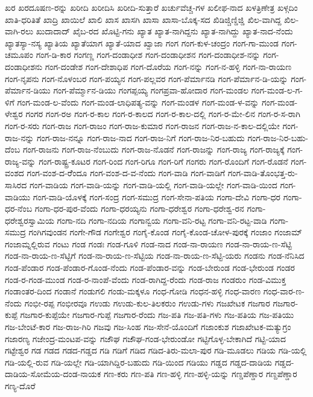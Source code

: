 {ಖರ
ಖರದೂಷಣ-ರನ್ನು
ಖರೀದಿ
ಖರೀದಿಸಿ
ಖರೀದಿ-ಸುತ್ತಾರೆ
ಖರ್ಚುವೆಚ್ಚ-ಗಳ
ಖಲೀಫ-ನಾದ
ಖಳತ್ರಿಣೇತ್ರ
ಖಳ್ಗದಿಂ
ಖಾತಿ-ಧರಿತಿತೆ
ಖಾದ್ರಿ
ಖಾಯಿಲೆ
ಖಾಲಿ
ಖಾಸ
ಖಾಸಗಿ
ಖಾಸಾ
ಖಾಸಾ-ಬೊಕ್ಕ-ಸದ
ಖಿಡಿಜ್ಚಿಣ್ಡಿಜ್ಡಿ
ಖಿಲ-ವಾಗಿದ್ದ
ಖಿಲ-ವಾಗಿ-ರಲು
ಖುದಾದಾದ್
ಖೈಬ-ರದ
ಖೊಟ್ಟಿ-ಗನು
ಖ್ಯಾತ
ಖ್ಯಾತ-ನಾಗಿದ್ದನು
ಖ್ಯಾತ-ನಾಗಿದ್ದು
ಖ್ಯಾತ-ನಾದ-ನೆಂದು
ಖ್ಯಾತಸ್ಯಾ-ನಸ್ಯ
ಖ್ಯಾತಿಯ
ಖ್ಯಾತೆಯಾಗ
ಖ್ಯಾತೆ-ಯಾದ
ಖ್ವಾಜಾ
ಗಂಗ
ಗಂಗ-ಕುಳ-ಚಂದ್ರಂ
ಗಂಗ-ಗಾ-ಮುಂಡ
ಗಂಗ-ಚಮೂಪಂ
ಗಂಗ-ಡಿ-ಕಾರ
ಗಂಗಣ್ಣ
ಗಂಗ-ದಂಡಾಧೀಶ
ಗಂಗ-ದಂಡಾಧೀಶನ
ಗಂಗ-ದಂಡಾಧೀಶ-ನನ್ನು
ಗಂಗ-ದಂಡಾಧೀಶನು
ಗಂಗ-ದಂಡೇಶ
ಗಂಗ-ದೇಶಾಧಿಪ
ಗಂಗ-ದೊರೆಯ
ಗಂಗ-ನನ್ನು
ಗಂಗ-ನ-ಹಳ್ಳಿ
ಗಂಗ-ನಾ-ರಾಯಣ
ಗಂಗ-ನೃಪನು
ಗಂಗ-ನೊಳಂಬರ
ಗಂಗ-ಪಯ್ಯನ
ಗಂಗ-ಪಲ್ಲವರ
ಗಂಗ-ಪೆರ್ಮಾನಡಿ
ಗಂಗ-ಪೆರ್ಮಾನ-ಡಿ-ಯನ್ನು
ಗಂಗ-ಪೆರ್ಮಾನ-ಡಿಯು
ಗಂಗ-ಪೆರ್ಮ್ಮಾನ-ಡಿಯು
ಗಂಗಪ್ಪಯ್ಯ
ಗಂಗಪ್ರವಾ-ಹೋದಾರ
ಗಂಗ-ಮಂಡಲ
ಗಂಗ-ಮಂಡ-ಲ-ಗ-ಳಿಗೆ
ಗಂಗ-ಮಂಡ-ಲ-ವೆಂದು
ಗಂಗ-ಮಂಡ-ಲಾಧಿಪತ್ಯ-ವನ್ನು
ಗಂಗ-ಮಂಡಳ
ಗಂಗ-ಮಂಡ-ಳ-ವನ್ನು
ಗಂಗ-ಮಂಡ-ಳೇಶ್ವರ
ಗಂಗರ
ಗಂಗ-ರಅ
ಗಂಗ-ರ-ಕಾಲ
ಗಂಗ-ರ-ಕಾಲದ
ಗಂಗ-ರ-ಕಾಲ-ದಲ್ಲಿ
ಗಂಗ-ರ-ಮೇ-ಲಿನ
ಗಂಗ-ರ-ಸ-ರಾಗಿ
ಗಂಗ-ರ-ಸರು
ಗಂಗ-ರಾಜ
ಗಂಗ-ರಾಜಂ
ಗಂಗ-ರಾಜ-ಕುಮಾರ
ಗಂಗ-ರಾಜನ
ಗಂಗ-ರಾಜ-ನ-ಕಾಲ-ದಲ್ಲಿಯೇ
ಗಂಗ-ರಾಜ-ನನ್ನು
ಗಂಗ-ರಾಜ-ನನ್ನೂ
ಗಂಗ-ರಾಜ-ನಾದ
ಗಂಗ-ರಾಜ-ನಿಗೆ
ಗಂಗ-ರಾಜ-ನಿರ-ಬಹುದು
ಗಂಗ-ರಾಜ-ನಿರ-ಬಹು-ದೆಂಬ
ಗಂಗ-ರಾಜನು
ಗಂಗ-ರಾಜ-ನೆಂಬುದು
ಗಂಗ-ರಾಜ-ನೊಡನೆ
ಗಂಗ-ರಾಜನ್ನು
ಗಂಗ-ರಾಜ್ಯ
ಗಂಗ-ರಾಜ್ಯಕ್ಕೆ
ಗಂಗ-ರಾಜ್ಯ-ವನ್ನು
ಗಂಗ-ರಾಷ್ಟ್ರ-ಕೂಟರ
ಗಂಗ-ರಿಂದ
ಗಂಗ-ರಿಗೂ
ಗಂಗ-ರಿಗೆ
ಗಂಗರು
ಗಂಗ-ರೊಂದಿಗೆ
ಗಂಗ-ರೊಡನೆ
ಗಂಗ-ವಂಶದ
ಗಂಗ-ವಂಶ-ದ-ರೆೆಂದೂ
ಗಂಗ-ವಂಶ-ದ-ವ-ನೆಂದು
ಗಂಗ-ವಾಡಿ
ಗಂಗ-ವಾಡಿಗೆ
ಗಂಗ-ವಾಡಿ-ತೊಂಭತ್ತ-ರು-ಸಾಸಿರದ
ಗಂಗ-ವಾಡಿಯ
ಗಂಗ-ವಾಡಿ-ಯನ್ನು
ಗಂಗ-ವಾಡಿ-ಯಲ್ಲಿ
ಗಂಗ-ವಾಡಿ-ಯಲ್ಲೇ
ಗಂಗ-ವಾಡಿ-ಯಿಂದ
ಗಂಗ-ವಾಡಿಯು
ಗಂಗ-ವಾಡಿ-ಯೊಳಕ್ಕೆ
ಗಂಗ-ಸಂದ್ರ
ಗಂಗ-ಸಮುದ್ರ
ಗಂಗ-ಸೇನಾ-ಪತಿಯ
ಗಂಗಾ-ದೇವಿ
ಗಂಗಾ-ಧರ
ಗಂಗಾ-ಧರ-ನೆಂಬ
ಗಂಗಾ-ಧರ-ಪುರ-ವೆಂದು
ಗಂಗಾ-ಧರಯ್ಯನು
ಗಂಗಾ-ಧರೇಶ್ವರ
ಗಂಗಾ-ಧರೇಶ್ವ-ರನ
ಗಂಗಾ-ಧರೇಶ್ವರಸ್ವಾಮಿಯ
ಗಂಗಾ-ನದಿ
ಗಂಗಾ-ನದಿಯ
ಗಂಗಾನ್ವಯ
ಗಂಗಾ-ವನಿ-ರಟ್ಟ
ಗಂಗಾ-ವನಿ-ರಟ್ಟ-ವಾಡಿ
ಗಂಗಾ-ಸಮುದ್ರ
ಗಂಗಿಗವುಂಡನ
ಗಂಗೇ-ಗೌಡ
ಗಂಗೇಶ್ವರ
ಗಂಗೈ-ಕೊಂಡ
ಗಂಗೈ-ಕೊಂಡ-ಚೋಳ-ಪುರಕ್ಕೆ
ಗಂಜಾಂ
ಗಂಜಾಮ್
ಗಂಜಾಮ್ನಲ್ಲಿರುವ
ಗಂಟು
ಗಂಡ
ಗಂಡಃ
ಗಂಡ-ಗೂಳಿ
ಗಂಡ-ನಾದ
ಗಂಡ-ನಾ-ರಾಯಣ
ಗಂಡ-ನಾ-ರಾಯ-ಣ-ಸೆಟ್ಟಿ
ಗಂಡ-ನಾ-ರಾಯ-ಣ-ಸೆಟ್ಟಿಗೆ
ಗಂಡ-ನಾ-ರಾಯ-ಣ-ಸೆಟ್ಟಿಯ
ಗಂಡ-ನಾ-ರಾಯ-ಣ-ಸೆಟ್ಟಿ-ಯರು
ಗಂಡನು
ಗಂಡ-ನೆನಿಸಿದ
ಗಂಡ-ಪೆಂಡಾರ
ಗಂಡ-ಪೆಂಡಾರ-ಗೊಂಡ-ನೆಂದು
ಗಂಡ-ಪೆಂಡಾರ-ವನ್ನು
ಗಂಡ-ಬೇರುಂಡ
ಗಂಡ-ಭೇರುಂಡ
ಗಂಡರ
ಗಂಡ-ರ-ಗಂಡ-ಮುಂಡ
ಗಂಡ-ರ-ನಾಂಪೆ-ವೆಂದು
ಗಂಡ-ರಾಗಿದ್ದ-ರೆಂದು
ಗಂಡ-ರಾಜ
ಗಂಡರುಂ
ಗಂಡ-ವಿಮುಕ್ತ
ಗಂಡಾಂತರ-ದಿಂದ
ಗಂಡಾನೆ
ಗಂಡುಗಲಿ
ಗಂಡು-ಮಕ್ಕಳೂ
ಗಂಧ-ಗೋಡಿ
ಗಂಧನ-ಹಳ್ಳಿ
ಗಂಧ-ವಾರಣ
ಗಂಧ-ವಾರ-ಣ-ನೆಂದು
ಗಂಭೀ-ರಪ್ಪ
ಗಂಭೀರವೂ
ಗಉಡು
ಗಉಡು-ಕುಲ-ತಿಲಕರುಂ
ಗಉಡು-ಗಳು
ಗಜಖೇಟಕ
ಗಜಗಾರ
ಗಜಗಾರ-ಕುಪ್ಪೆ
ಗಜಗಾರ-ಕುಪ್ಪೆಯೇ
ಗಜಗಾರ-ಗುಪ್ಪೆ
ಗಜಗಾರ-ರೆಂದು
ಗಜ-ಪತಿ
ಗಜ-ಪತಿ-ಗಳು
ಗಜ-ಪತಿಯ
ಗಜ-ಪತಿಯು
ಗಜ-ಬೇಂಟೆ-ಕಾರ
ಗಜ-ರಾಜ-ಗಿರಿ
ಗಜವು
ಗಜ-ಸಿಂಹ
ಗಜ-ಸೇನೆ-ಯೊಂದಿಗೆ
ಗಜಾಂಕುಶ
ಗಜಾಖೇಟಕ-ಮತ್ಯುಗ್ರಂ
ಗಜಾರಣ್ಯ
ಗಜೇಂದ್ರ-ಮಂಟಪ-ವನ್ನು
ಗಜೌಘ
ಗಜೌಘ-ಗಂಡ-ಭೇರುಂಡೋ
ಗಟ್ಟಿಗೊಳ್ಳ-ಬೇಕಾಗಿದೆ
ಗಟ್ಟಿ-ಯಾದ
ಗಟ್ಟೇಶ್ವರ
ಗಡ
ಗಡದ
ಗಡದ-ಗಡ್ಡದ
ಗಡಿ
ಗಡಿಗೆ
ಗಡಿದ
ಗಡಿದ-ತಿರು-ಮಲಾ-ಪುರ
ಗಡಿ-ಮೂಡಲು
ಗಡಿಯ
ಗಡಿ-ಯಲ್ಲಿ
ಗಡಿ-ಯಲ್ಲಿ-ರುವ
ಗಡಿ-ಯಲ್ಲೇ
ಗಡಿ-ಯಾಗಿದ್ದಿರ-ಬಹುದು
ಗಡಿ-ಯಿಂದ
ಗಡಿಯು
ಗಡ್ಡದ
ಗಡ್ಡದ-ದಾಡಿಯ
ಗಡ್ಡದ-ದಾಡಿಯ-ಸೋಮೆಯ-ದಂಡ-ನಾಯಕ
ಗಣ-ಕರು
ಗಣ-ಪತಿ
ಗಣ-ಹಳ್ಳಿ
ಗಣ-ಹಳ್ಳಿ-ಯನ್ನು
ಗಣ್ಡಪೆಣ್ಡಾರ
ಗಣ್ದಪೆಣ್ಡಾರ
ಗಣ್ಯ-ದೊರೆ
}
